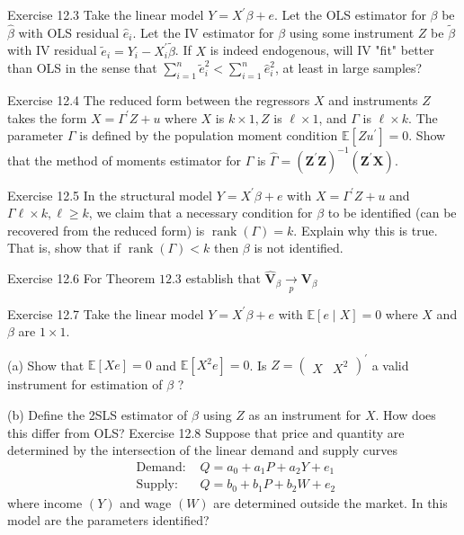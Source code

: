 \documentclass[10pt]{article}
\begin{document}
Exercise 12.3 Take the linear model $Y=X^{\prime} \beta+e$. Let the OLS estimator for $\beta$ be $\widehat{\beta}$ with OLS residual $\widehat{e}_{i}$. Let the IV estimator for $\beta$ using some instrument $Z$ be $\widetilde{\beta}$ with IV residual $\widetilde{e}_{i}=Y_{i}-X_{i}^{\prime} \widetilde{\beta}$. If $X$ is indeed endogenous, will IV "fit" better than OLS in the sense that $\sum_{i=1}^{n} \widetilde{e}_{i}^{2}<\sum_{i=1}^{n} \widehat{e}_{i}^{2}$, at least in large samples?

Exercise 12.4 The reduced form between the regressors $X$ and instruments $Z$ takes the form $X=\Gamma^{\prime} Z+u$ where $X$ is $k \times 1, Z$ is $\ell \times 1$, and $\Gamma$ is $\ell \times k$. The parameter $\Gamma$ is defined by the population moment condition $\mathbb{E}\left[Z u^{\prime}\right]=0$. Show that the method of moments estimator for $\Gamma$ is $\widehat{\Gamma}=\left(\boldsymbol{Z}^{\prime} \boldsymbol{Z}\right)^{-1}\left(\boldsymbol{Z}^{\prime} \boldsymbol{X}\right)$.

Exercise 12.5 In the structural model $Y=X^{\prime} \beta+e$ with $X=\Gamma^{\prime} Z+u$ and $\Gamma \ell \times k, \ell \geq k$, we claim that a necessary condition for $\beta$ to be identified (can be recovered from the reduced form) is $\operatorname{rank}(\Gamma)=k$. Explain why this is true. That is, show that if $\operatorname{rank}(\Gamma)<k$ then $\beta$ is not identified.

Exercise 12.6 For Theorem $12.3$ establish that $\widehat{\boldsymbol{V}}_{\beta} \underset{p}{\longrightarrow} \boldsymbol{V}_{\beta}$

Exercise 12.7 Take the linear model $Y=X^{\prime} \beta+e$ with $\mathbb{E}[e \mid X]=0$ where $X$ and $\beta$ are $1 \times 1$.

(a) Show that $\mathbb{E}[X e]=0$ and $\mathbb{E}\left[X^{2} e\right]=0$. Is $Z=\left(\begin{array}{ll}X & X^{2}\end{array}\right)^{\prime}$ a valid instrument for estimation of $\beta$ ?

(b) Define the 2SLS estimator of $\beta$ using $Z$ as an instrument for $X$. How does this differ from OLS? Exercise 12.8 Suppose that price and quantity are determined by the intersection of the linear demand and supply curves
$$
\begin{aligned}
\text { Demand: } & Q=a_{0}+a_{1} P+a_{2} Y+e_{1} \\
\text { Supply: } & Q=b_{0}+b_{1} P+b_{2} W+e_{2}
\end{aligned}
$$
where income $(Y)$ and wage $(W)$ are determined outside the market. In this model are the parameters identified?
\end{document}
